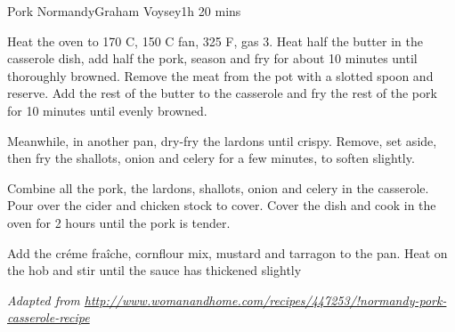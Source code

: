 \begin{recipe}{Pork Normandy}{Graham Voysey}{1h 20 mins}

  Heat the oven to 170 C, 150 C fan, 325 F, gas 3. Heat half the butter in
  the casserole dish, add half the pork, season and fry for about 10
  minutes until thoroughly browned. Remove the meat from the pot with a
  slotted spoon and reserve. Add the rest of the butter to the casserole
  and fry the rest of the pork for 10 minutes until evenly browned.

  Meanwhile, in another pan, dry-fry the lardons until crispy. Remove, set
  aside, then fry the shallots, onion and celery for a few minutes, to
  soften slightly.

  Combine all the pork, the lardons, shallots, onion and celery in the
  casserole. Pour over the cider and chicken stock to cover. Cover the dish
  and cook in the oven for 2 hours until the pork is tender.

  Add the cr\'eme fra\^iche, cornflour mix, mustard and tarragon to the
  pan. Heat on the hob and stir until the sauce has thickened slightly
\end{recipe}

\textit{Adapted from
  \url{http://www.womanandhome.com/recipes/447253/!normandy-pork-casserole-recipe}}
